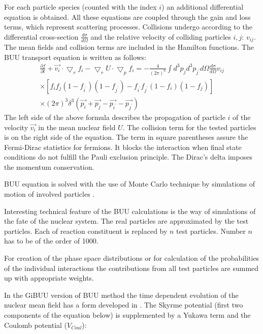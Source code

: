 For each particle species (counted with the index $i$) an additional differential equation is obtained. All these equations are coupled through the gain and loss terms, which represent scattering processes. Collisions undergo according to the differential 
cross-section $\frac{d\sigma}{d\Omega}$ and the relative 
velocity of colliding particles $i, j$: $v_{ij}$. The mean fields and collision terms are included in the Hamilton functions. 
The BUU transport equation is written as follows:
\begin{align}
\frac{\partial f}{\partial t} +  \vec{v_{i}}  \cdot \bigtriangledown_{r} f_{i}   -   
\bigtriangledown_{r}U   \cdot   \bigtriangledown_{p}f_{i}  =   
 -\frac{4}{(2\pi)^{6}}  \int d^{3}p_{j} d^{3}p_{j^{'}}   d\Omega\frac{d\sigma}{d\Omega}   v_{ij} \nonumber\\
\times 
\left [ 
f_{i}f_{j} (1  -  f_{i^{'}}) (1  -  f_{j^{'}})   -   
f_{i^{'}}f_{j^{'}}(1  -f_{i})(1-  f_{j})  
\right ]\nonumber\\ 
\times  (2\pi)^{3} \delta^{3} (\vec{p_{i}} + \vec{p_{j}} - \vec{p_{i^{'}}} - \vec{p_{j^{'}}}) 
\end{align}
The left side of the above formula describes the propagation of particle $i$ of the velocity $\vec{v_{i}}$ in the mean nuclear field $U$. 
The collision term for the tested particles is on the right side of the equation. The term in square parentheses assure the Fermi-Dirac statistics for fermions. 
It blocks the interaction when final state conditions do not fulfill the Pauli exclusion principle. The Dirac's delta imposes the momentum conservation.

BUU equation is solved with the use of Monte Carlo technique by  simulations of motion of involved particles 
\cite{Bertsch_PhysRevC.29.673}. %

Interesting technical feature of the BUU calculations is the way of simulations of the fate of the 
nuclear system. 
The real particles are approximated by the test particles. 
Each of reaction constituent is replaced by $n$ test particles.
Number $n$ has to be of the order of 1000.

For creation of the phase space distributions or 
for calculation of the probabilities of the individual interactions the contributions from all test particles are summed up with appropriate weights.

In the GiBUU version of BUU method the time dependent evolution of the nuclear mean field has a form developed in \cite{Niita1989391}. %
The Skyrme potential (first two components of the equation below) is supplemented by a Yukawa term and the Coulomb potential ($V_{Coul}$):

